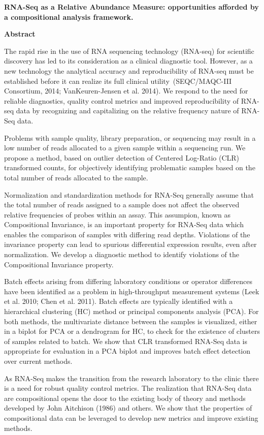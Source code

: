 \documentclass [10pt]{article}\usepackage[]{graphicx}\usepackage[]{color}
\begin{document}
\begin{center}
\textbf{\large RNA-Seq as a Relative Abundance Measure: opportunities afforded by a compositional analysis framework.}


\end{center}

\vskip 0.5cm {\centerline{\bf Abstract}}

The rapid rise in the use of RNA sequencing technology (RNA-seq) for scientific discovery has led to its consideration as a clinical diagnostic tool. However, as a new technology the analytical accuracy and reproducibility of RNA-seq must be established before it can realize its full clinical utility~(SEQC/MAQC-III Consortium, 2014; VanKeuren-Jensen et al. 2014). We respond to the need for reliable diagnostics, quality control metrics and improved reproducibility of RNA-seq data by recognizing and capitalizing on the relative frequency nature of RNA-Seq data.  

Problems with sample quality, library preparation, or sequencing may result in a low number of reads allocated to a given sample within a sequencing run. We propose a method, based on outlier detection of Centered Log-Ratio (CLR) transformed counts, for objectively identifying problematic samples based on the total number of reads allocated to the sample. 


Normalization and standardization methods for RNA-Seq generally assume that the total number of reads assigned to a sample does not affect the observed relative frequencies of probes within an assay. This assumpion, known as Compositional Invariance, is an important property for RNA-Seq data which enables the comparison of samples with differing read depths.  Violations of the invariance property can lead to spurious differential expression results, even after normalization.  We develop a diagnostic method to identify violations of the  Compositional Invariance property. 

Batch effects arising from differing laboratory conditions or operator differences have been identified as a problem in high-throughput measurement systems (Leek et al. 2010; Chen et al. 2011).  Batch effects are typically identified with a hierarchical clustering (HC) method or principal components analysis (PCA).  For both methods, the multivariate distance between the samples is visualized, either in a biplot for PCA or a dendrogram for HC, to check for the existence of clusters of samples related to batch. We show that CLR transformed RNA-Seq data is appropriate for evaluation in a PCA biplot and improves batch effect detection over current methods.

As RNA-Seq makes the transition from the research laboratory to the clinic there is a need for robust quality control metrics.  The realization that RNA-Seq data are compositional opens the door to the existing body of theory and methods developed by John Aitchison (1986) and others.  We show that the properties of compositional data can be leveraged to develop new metrics and improve existing methods.
\end{document}
